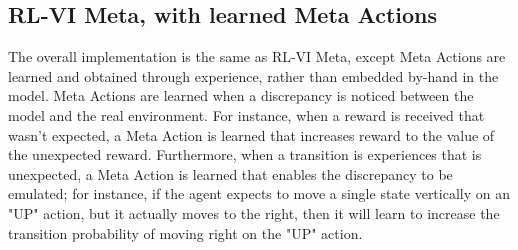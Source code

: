 \subsection{RL-VI Meta, with learned Meta Actions}
The overall implementation is the same as RL-VI Meta, except Meta Actions are learned and obtained through experience, rather than embedded by-hand in the model. Meta Actions are learned when a discrepancy is noticed between the model and the real environment. For instance, when a reward is received that wasn't expected, a Meta Action is learned that increases reward to the value of the unexpected reward. Furthermore, when a transition is experiences that is unexpected, a Meta Action is learned that enables the discrepancy to be emulated; for instance, if the agent expects to move a single state vertically on an "UP" action, but it actually moves to the right, then it will learn to increase the transition probability of moving right on the "UP" action.




